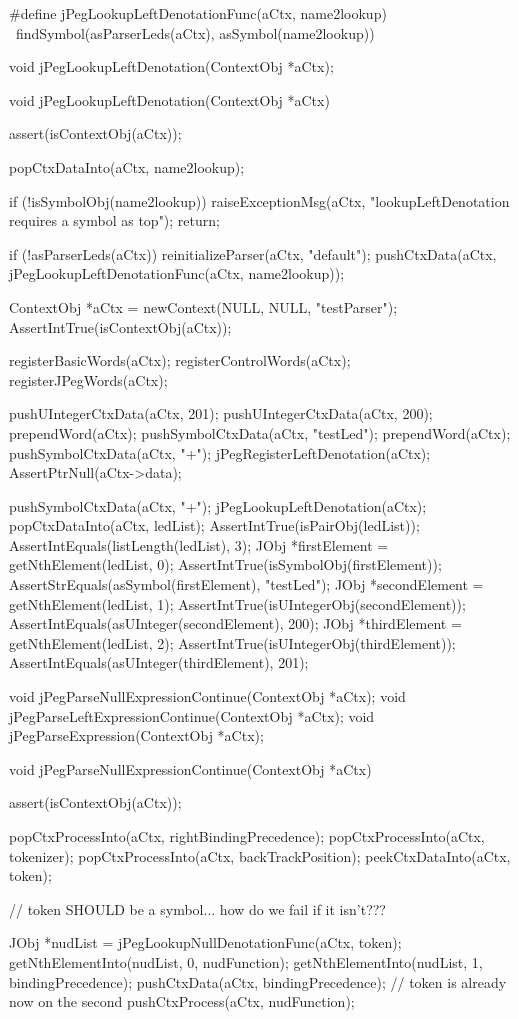 \startCHeader
#define jPegLookupLeftDenotationFunc(aCtx, name2lookup)  \
  findSymbol(asParserLeds(aCtx), asSymbol(name2lookup))

void jPegLookupLeftDenotation(ContextObj *aCtx);
\stopCHeader

\startCCode
void jPegLookupLeftDenotation(ContextObj *aCtx) {
  assert(isContextObj(aCtx));

  popCtxDataInto(aCtx, name2lookup);

  if (!isSymbolObj(name2lookup)) {
    raiseExceptionMsg(aCtx,
      "lookupLeftDenotation requires a symbol as top");
    return;
  }

  if (!asParserLeds(aCtx)) reinitializeParser(aCtx, "default");
  pushCtxData(aCtx, jPegLookupLeftDenotationFunc(aCtx, name2lookup));
}
\stopCCode


\startCTest
  ContextObj *aCtx = newContext(NULL, NULL, "testParser");
  AssertIntTrue(isContextObj(aCtx));
  
  registerBasicWords(aCtx);
  registerControlWords(aCtx);
  registerJPegWords(aCtx);
  
  pushUIntegerCtxData(aCtx, 201);
  pushUIntegerCtxData(aCtx, 200);
  prependWord(aCtx);
  pushSymbolCtxData(aCtx, "testLed");
  prependWord(aCtx);
  pushSymbolCtxData(aCtx, "+");
  jPegRegisterLeftDenotation(aCtx);
  AssertPtrNull(aCtx->data);
  
  pushSymbolCtxData(aCtx, "+");
  jPegLookupLeftDenotation(aCtx);
  popCtxDataInto(aCtx, ledList);
  AssertIntTrue(isPairObj(ledList));
  AssertIntEquals(listLength(ledList), 3);
  JObj *firstElement = getNthElement(ledList, 0);
  AssertIntTrue(isSymbolObj(firstElement));
  AssertStrEquals(asSymbol(firstElement), "testLed");
  JObj *secondElement = getNthElement(ledList, 1);
  AssertIntTrue(isUIntegerObj(secondElement));
  AssertIntEquals(asUInteger(secondElement), 200);
  JObj *thirdElement = getNthElement(ledList, 2);
  AssertIntTrue(isUIntegerObj(thirdElement));
  AssertIntEquals(asUInteger(thirdElement), 201);
\stopCTest
\stopTestCase
\stopTestSuite

\startTestSuite[parseExpression]

\startCHeader
void jPegParseNullExpressionContinue(ContextObj *aCtx);
void jPegParseLeftExpressionContinue(ContextObj *aCtx);
void jPegParseExpression(ContextObj *aCtx);
\stopCHeader

\startCCode
void jPegParseNullExpressionContinue(ContextObj *aCtx) {
  assert(isContextObj(aCtx));
  
  popCtxProcessInto(aCtx, rightBindingPrecedence);
  popCtxProcessInto(aCtx, tokenizer);
  popCtxProcessInto(aCtx, backTrackPosition);
  peekCtxDataInto(aCtx, token);
  
  // token SHOULD be a symbol... how do we fail if it isn't???
  
  JObj *nudList = jPegLookupNullDenotationFunc(aCtx, token);
  getNthElementInto(nudList, 0, nudFunction);
  getNthElementInto(nudList, 1, bindingPrecedence);
  pushCtxData(aCtx, bindingPrecedence);
  // token is already now on the second
  pushCtxProcess(aCtx, nudFunction);
}

